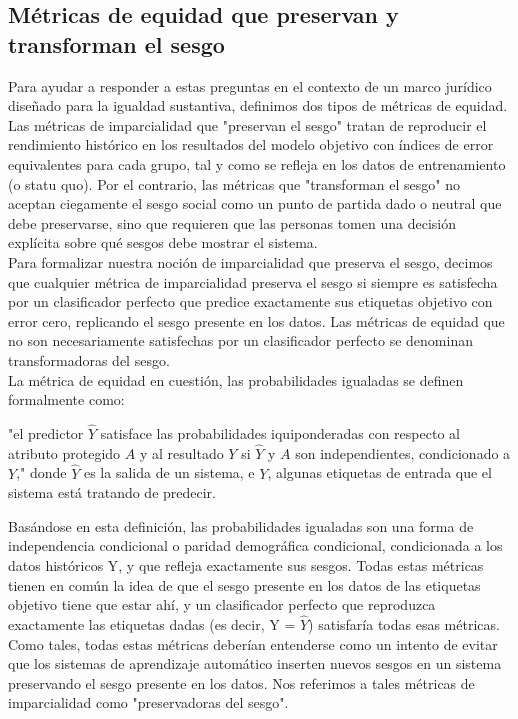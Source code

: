 \subsection{Métricas de equidad que preservan y transforman el sesgo}
Para ayudar a responder a estas preguntas en el contexto de un marco jurídico diseñado para la igualdad sustantiva, definimos dos tipos de métricas de equidad. Las métricas de imparcialidad que "preservan el sesgo" tratan de reproducir el rendimiento histórico en los resultados del modelo objetivo con índices de error equivalentes para cada grupo, tal y como se refleja en los datos de entrenamiento (o statu quo). Por el contrario, las métricas que "transforman el sesgo" no aceptan ciegamente el sesgo social como un punto de partida dado o neutral que debe preservarse, sino que requieren que las personas tomen una decisión explícita sobre qué sesgos debe mostrar el sistema.\\

Para formalizar nuestra noción de imparcialidad que preserva el sesgo, decimos que cualquier métrica de imparcialidad preserva el sesgo si siempre es satisfecha por un clasificador perfecto que predice exactamente sus etiquetas objetivo con error cero, replicando el sesgo presente en los datos. Las métricas de equidad que no son necesariamente satisfechas por un clasificador perfecto se denominan transformadoras del sesgo.\\

La métrica de equidad en cuestión, las probabilidades igualadas se definen formalmente como: 

"el predictor $\hat{Y}$ satisface las probabilidades iquiponderadas con respecto al atributo protegido $A$ y al resultado $Y$ si $\hat{Y}$ y $A$ son independientes, condicionado a $Y$,"  donde $\hat{Y}$ es la salida de un sistema, e $Y$, algunas etiquetas de entrada que el sistema está tratando de predecir.

Basándose en esta definición, las probabilidades igualadas son una forma de independencia condicional o paridad demográfica condicional, condicionada a los datos históricos Y, y que refleja exactamente sus sesgos. Todas estas métricas tienen en común la idea de que el sesgo presente en los datos de las etiquetas objetivo tiene que estar ahí, y un clasificador perfecto que reproduzca exactamente las etiquetas dadas (es decir, Y = $\hat{Y}$) satisfaría todas esas métricas. Como tales, todas estas métricas deberían entenderse como un intento de evitar que los sistemas de aprendizaje automático inserten nuevos sesgos en un sistema preservando el sesgo presente en los datos. Nos referimos a tales métricas de imparcialidad como "preservadoras del sesgo". \\

